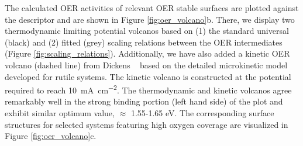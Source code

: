%
%
The calculated OER activities of relevant OER stable surfaces are plotted against the \DGOmOH{} descriptor and are shown in Figure \ref{fig:oer_volcano}b.
%
There, we display two thermodynamic limiting potential volcanos based on (1) the standard universal~\cite{Man2011} (black) and (2) fitted (grey) scaling relations between the OER intermediates (Figure \ref{fig:scaling_relations}).
%
Additionally, we have also added a kinetic OER volcano (dashed line) from Dickens ~\cite{Dickens2019} based on the detailed microkinetic model developed for rutile systems.
%
The kinetic volcano is constructed at the potential required to reach \SI[mode=text]{10}{\mA\per\cm\squared}.
%
The thermodynamic and kinetic volcanos agree remarkably well in the strong binding portion (left hand side) of the plot and exhibit similar optimum value, \DGOmOH{} $\approx$ \num{1.55}-\num{1.65} eV.
%
The corresponding surface structures for selected systems featuring high oxygen coverage are visualized in Figure \ref{fig:oer_volcano}c.



